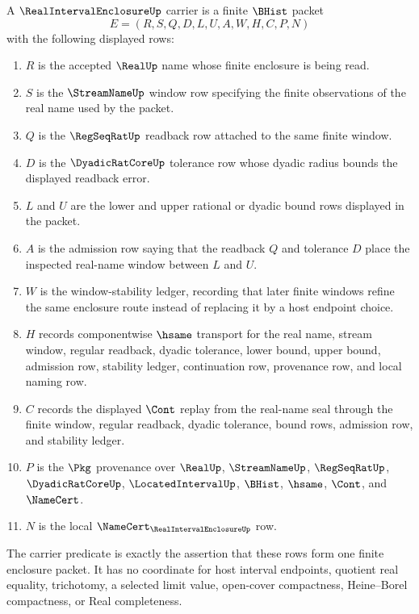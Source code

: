 \begin{definition}
\label{def:real-interval-enclosure-carrier}
A $\RealIntervalEnclosureUp$ carrier is a finite $\BHist$ packet
$$
E=(R,S,Q,D,L,U,A,W,H,C,P,N)
$$
with the following displayed rows:
\begin{enumerate}
\item $R$ is the accepted $\RealUp$ name whose finite enclosure is being read.
\item $S$ is the $\StreamNameUp$ window row specifying the finite observations of the real name used by the packet.
\item $Q$ is the $\RegSeqRatUp$ readback row attached to the same finite window.
\item $D$ is the $\DyadicRatCoreUp$ tolerance row whose dyadic radius bounds the displayed readback error.
\item $L$ and $U$ are the lower and upper rational or dyadic bound rows displayed in the packet.
\item $A$ is the admission row saying that the readback $Q$ and tolerance $D$ place the inspected real-name window between $L$ and $U$.
\item $W$ is the window-stability ledger, recording that later finite windows refine the same enclosure route instead of replacing it by a host endpoint choice.
\item $H$ records componentwise $\hsame$ transport for the real name, stream window, regular readback, dyadic tolerance, lower bound, upper bound, admission row, stability ledger, continuation row, provenance row, and local naming row.
\item $C$ records the displayed $\Cont$ replay from the real-name seal through the finite window, regular readback, dyadic tolerance, bound rows, admission row, and stability ledger.
\item $P$ is the $\Pkg$ provenance over $\RealUp$, $\StreamNameUp$, $\RegSeqRatUp$, $\DyadicRatCoreUp$, $\LocatedIntervalUp$, $\BHist$, $\hsame$, $\Cont$, and $\NameCert$.
\item $N$ is the local $\NameCert_{\RealIntervalEnclosureUp}$ row.
\end{enumerate}
The carrier predicate is exactly the assertion that these rows form one finite enclosure packet. It has no coordinate for host interval endpoints, quotient real equality, trichotomy, a selected limit value, open-cover compactness, Heine--Borel compactness, or Real completeness.
\end{definition}

